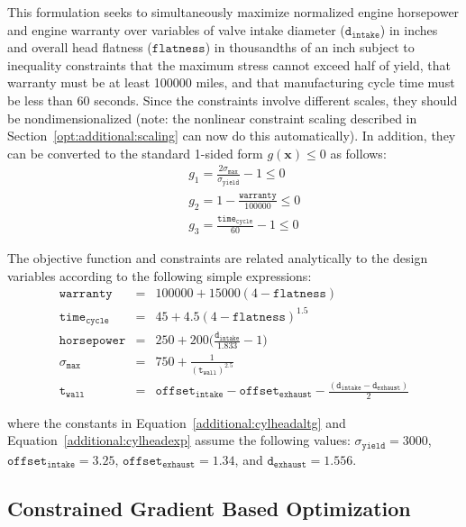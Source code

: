 This formulation seeks to simultaneously maximize normalized engine
horsepower and engine warranty over variables of valve intake diameter
($\mathtt{d_{intake}}$) in inches and overall head flatness
($\mathtt{flatness}$) in thousandths of an inch subject to inequality
constraints that the maximum stress cannot exceed half of yield, that
warranty must be at least 100000 miles, and that manufacturing cycle
time must be less than 60 seconds. Since the constraints involve
different scales, they should be nondimensionalized (note: the
nonlinear constraint scaling described in
Section~\ref{opt:additional:scaling} can now do this
automatically). In addition, they can be converted to the standard
1-sided form $g(\mathbf{x}) \leq 0$ as follows:
\begin{eqnarray}
  & & g_1=\frac{2\sigma_{\mathtt{max}}}{\sigma_{\mathtt{yield}}}-1 \leq 0
  \nonumber\\
  & & g_2=1-\frac{\mathtt{warranty}}{100000} \leq 0
  \label{additional:cylheadaltg}\\
  & & g_3=\frac{\mathtt{time_{cycle}}}{60}-1 \leq 0\nonumber
\end{eqnarray}

The objective function and constraints are related analytically to the
design variables according to the following simple expressions:
\begin{eqnarray}
\mathtt{warranty}     &=& 100000+15000(4-\mathtt{flatness})\nonumber\\
\mathtt{time_{cycle}} &=& 45+4.5(4-\mathtt{flatness})^{1.5}\nonumber\\
\mathtt{horsepower}   &=& 250+200\bigg(\frac{\mathtt{d_{intake}}}{1.833}-1\bigg)
  \label{additional:cylheadexp}\\
\sigma_{\mathtt{max}} &=& 750+\frac{1}{(\mathtt{t_{wall}})^{2.5}}\nonumber\\
\mathtt{t_{wall}}     &=& \mathtt{offset_{intake}-offset_{exhaust}}-
  \frac{(\mathtt{d_{intake}-d_{exhaust}})}{2}\nonumber
\end{eqnarray}

where the constants in Equation~\ref{additional:cylheadaltg} and
Equation~\ref{additional:cylheadexp} assume the following values:
$\sigma_{\mathtt{yield}}=3000$, $\mathtt{offset_{intake}}=3.25$,
$\mathtt{offset_{exhaust}}=1.34$, and $\mathtt{d_{exhaust}}=1.556$.

\subsection{Constrained Gradient Based Optimization}

